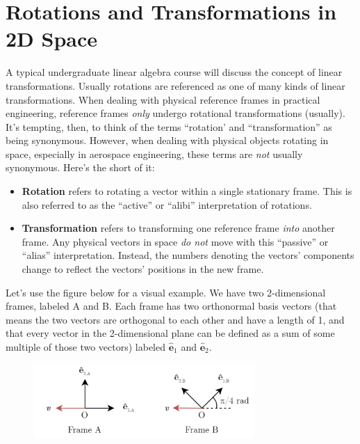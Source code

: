 \section*{Rotations and Transformations in 2D Space}

A typical undergraduate linear algebra course will discuss the concept of
linear transformations. Usually rotations are referenced as one of many kinds
of linear transformations. When dealing with physical reference frames in
practical engineering, reference frames \textit{only} undergo rotational
transformations (usually). It's tempting, then, to think of the terms
``rotation' and ``transformation'' as being synonymous. However, when dealing
with physical objects rotating in space, especially in aerospace engineering,
these terms are \textit{not} usually synonymous. Here's the short of it:

\begin{itemize}
\item \textbf{Rotation} refers to rotating a vector within a single stationary
  frame. This is also referred to as the ``active'' or ``alibi'' interpretation
  of rotations.

\item \textbf{Transformation} refers to transforming one reference frame
  \textit{into} another frame. Any physical vectors in space \textit{do not}
  move with this ``passive'' or ``alias'' interpretation. Instead, the numbers
  denoting the vectors' components change to reflect the vectors' positions in
  the new frame.
\end{itemize}

Let's use the figure below for a visual example. We have two 2-dimensional
frames, labeled A and B. Each frame has two orthonormal basis vectors (that
means the two vectors are orthogonal to each other and have a length of 1,
and that every vector in the 2-dimensional plane can be defined as a sum
of some multiple of those two vectors) labeled $\hat{\bm{e}}_1$ and
$\hat{\bm{e}}_2$.

\begin{figure}[h!]
    \centering
    \includegraphics[width=0.75\textwidth]{img/Two_2D_Frames.png}
\end{figure}

